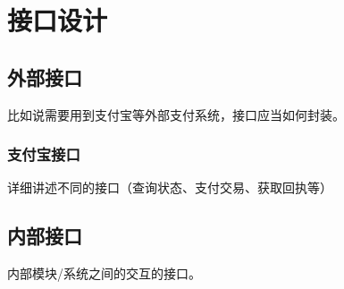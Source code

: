 \chapter{接口设计}
\section{外部接口}
比如说需要用到支付宝等外部支付系统，接口应当如何封装。

\subsection{支付宝接口}
详细讲述不同的接口（查询状态、支付交易、获取回执等）

\section{内部接口}
内部模块/系统之间的交互的接口。